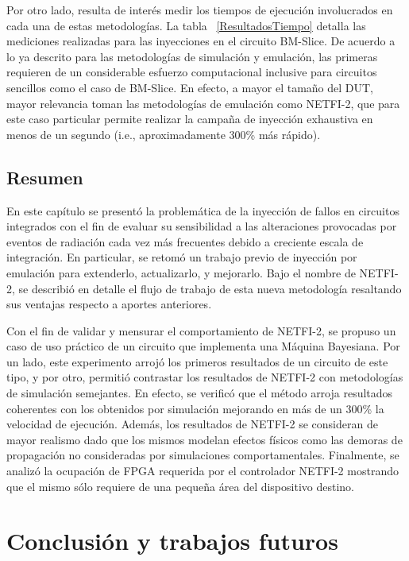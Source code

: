 \documentclass[a4paper,openright,12pt]{report}
\begin{document}
Por otro lado, resulta de interés medir los tiempos de ejecución involucrados en cada una de estas metodologías. La tabla ~\ref{ResultadosTiempo} detalla las mediciones realizadas para las inyecciones en el circuito BM-Slice. De acuerdo a lo ya descrito para las metodologías de simulación y emulación, las primeras requieren de un considerable esfuerzo computacional inclusive para circuitos sencillos como el caso de BM-Slice. En efecto, a mayor el tamaño del DUT, mayor relevancia toman las metodologías de emulación como NETFI-2, que para este caso particular permite realizar la campaña de inyección exhaustiva en menos de un segundo (i.e., aproximadamente 300\% más rápido).

\section{Resumen}
\label{Conclusion}

En este capítulo se presentó la problemática de la inyección de fallos en circuitos integrados con el fin de evaluar su sensibilidad a las alteraciones provocadas por eventos de radiación cada vez más frecuentes debido a creciente escala de integración. En particular, se retomó un trabajo previo de inyección por emulación para extenderlo, actualizarlo, y mejorarlo. Bajo el nombre de NETFI-2, se describió en detalle el flujo de trabajo de esta nueva metodología resaltando sus ventajas respecto a aportes anteriores.

Con el fin de validar y mensurar el comportamiento de NETFI-2, se propuso un caso de uso práctico de un circuito que implementa una Máquina Bayesiana. Por un lado, este experimento arrojó los primeros resultados de un circuito de este tipo, y por otro, permitió contrastar los resultados de NETFI-2 con metodologías de simulación semejantes. En efecto, se verificó que el método arroja resultados coherentes con los obtenidos por simulación mejorando en más de un 300\% la velocidad de ejecución. Además, los resultados de NETFI-2 se consideran de mayor realismo dado que los mismos modelan efectos físicos como las demoras de propagación no consideradas por simulaciones comportamentales. Finalmente, se analizó la ocupación de FPGA requerida por el controlador NETFI-2 mostrando que el mismo sólo requiere de una pequeña área del dispositivo destino.




\makeatletter
{}
\makeatother
\chapter{Conclusión y trabajos futuros}
\end{document}
